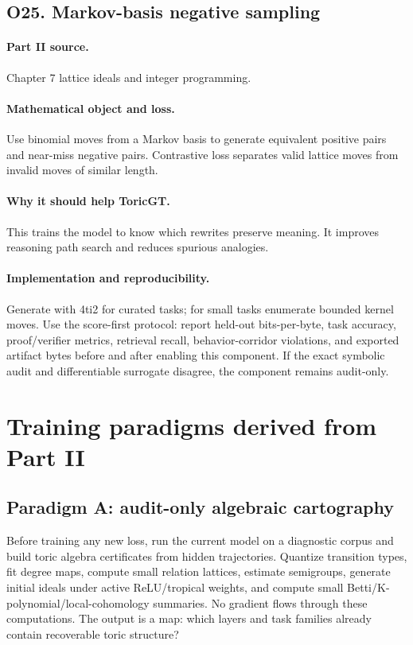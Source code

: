 \documentclass[11pt]{article}
\theoremstyle{definition}
\begin{document}
\subsection{O25. Markov-basis negative sampling}
\paragraph{Part II source.} Chapter 7 lattice ideals and integer programming.
\paragraph{Mathematical object and loss.} Use binomial moves from a Markov basis to generate equivalent positive pairs and near-miss negative pairs.  Contrastive loss separates valid lattice moves from invalid moves of similar length.
\paragraph{Why it should help ToricGT.} This trains the model to know which rewrites preserve meaning.  It improves reasoning path search and reduces spurious analogies.
\paragraph{Implementation and reproducibility.} Generate with 4ti2 for curated tasks; for small tasks enumerate bounded kernel moves.  Use the score-first protocol: report held-out bits-per-byte, task accuracy, proof/verifier metrics, retrieval recall, behavior-corridor violations, and exported artifact bytes before and after enabling this component.  If the exact symbolic audit and differentiable surrogate disagree, the component remains audit-only.

\section{Training paradigms derived from Part II}
\subsection{Paradigm A: audit-only algebraic cartography}
Before training any new loss, run the current model on a diagnostic corpus and build toric algebra certificates from hidden trajectories.  Quantize transition types, fit degree maps, compute small relation lattices, estimate semigroups, generate initial ideals under active ReLU/tropical weights, and compute small Betti/K-polynomial/local-cohomology summaries.  No gradient flows through these computations.  The output is a map: which layers and task families already contain recoverable toric structure?
\end{document}
